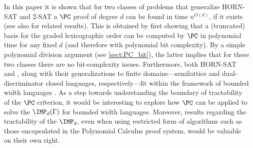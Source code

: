 \documentclass[11pt]{article}
\begin{document}


In this paper it is shown that for two classes of problems that generalize \textsc{HORN-SAT} and \textsc{2-SAT} a $\PC$ proof of degree $d$ can be found in time $n^{O(d)}$, if it exists (see also \cite{BharathiM21} for related results). This is obtained by first showing that a (truncated) \GB basis for the graded lexicographic order can be computed by $\PC$ in polynomial time for any fixed $d$ (and therefore with polynomial bit complexity). By a simple polynomial division argument (see \cref{sect:PC_bit}), the latter implies that for these two classes there are no bit-complexity issues. Furthermore, both \textsc{HORN-SAT} and , along with their generalizations to finite domains---semilattice and dual-discriminator closed languages, respectively---fit within the framework of bounded width languages \cite{JEAVONS_TRACTABLE_CONSTRAINTS}. As a step towards understanding the boundary of tractability of the $\PC$ criterion, it would be interesting to explore how $\PC$ can be applied to solve the $\IMP_d(\Gamma)$ for bounded width languages. Moreover, results regarding the tractability of the $\IMP_d$, even when using restricted form of algorithms such as those encapsulated in the Polynomial Calculus proof system, would be valuable on their own right.
\end{document}
